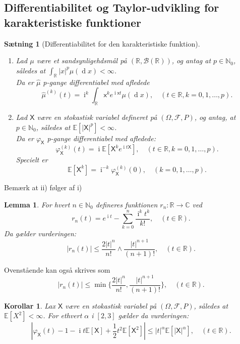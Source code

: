 \documentclass{article}
\newcommand{\N}{\mathbb{N}}
\newcommand{\R}{\mathbb{R}}
\newcommand{\C}{\mathbb{C}}
\newcommand{\E}{\mathbb{E}}
\newcommand{\1}{\mathbbm{1}}
\newcommand{\X}{\mathsf{X}}
\newcommand{\B}{\mathcal{B}}
\newcommand{\deriv}{\operatorname{d}}
\newcommand{\icomp}{\operatorname{i}}
\newcommand{\varx}{\varphi_\X}
\newcommand{\pfield}{(\Omega, \mathcal{F}, P)}
\newtheorem{lemma}[theorem]{Lemma}
\newtheorem{corollary}[theorem]{Korollar}
\newtheorem{proposition}[theorem]{Sætning}
\theoremstyle{boxed}
\begin{document}
\subsection{Differentiabilitet og Taylor-udvikling for karakteristiske funktioner}
\begin{theorem-box}
    \begin{proposition}[Differentiabilitet for den karakteristiske funktion]
        \begin{enumerate}
            \item[\textnormal{(i)}] Lad $\mu$ være et sandsynligehdsmål på $(\R, \B(\R))$, og antag at $p\in\N_0$, således at $\int_\R|x|^p\mu(\deriv x)<\infty$.
            \\Da er $\hat{\mu}$ p-gange differentiabel med afledede
            $$\hat{\mu}^{(k)}(t)=\icomp^k\int_{\R}\mathsf{x}^ke^{\icomp\mathsf{x}t}\mu(\deriv x), \quad (t\in\R, k=0,1,\dots, p).$$
            \item[\textnormal{(ii)}] Lad $\X$ være en stokastisk variabel defineret på $\pfield$, og antag, at $p\in\N_0$, således at $\E[|\X|^p]<\infty$.
            \\Da er $\varx$ p-gange differentiabel med afledede:
            $$\varx^{(k)}(t)=\icomp\E[\X^ke^{\icomp t\X}], \quad (t\in\R, k=0,1,\dots, p).$$ 
            Specielt er 
            $$\E[\X^k]=\icomp^{-k}\varx^{(k)}(0), \quad (k=0,1,\dots, p).$$
        \end{enumerate}
    \end{proposition}
\end{theorem-box}
Bemærk at ii) følger af i)
\begin{theorem-box}
    \begin{lemma}
        For hvert $n\in\N_0$ defineres funktionen $r_n:\R\rightarrow \C$ ved $$r_n(t)=e^{\icomp t}-\sum_{k=0}^n\frac{\icomp^k t^k}{k!}, \quad (t\in\R).$$
        Da gælder vurderingen:
        $$|r_n(t)|\leq \frac{2|t|^n}{n!}\wedge \frac{|t|^{n+1}}{(n+1)!},\quad  (t\in\R).$$
    \end{lemma}
\end{theorem-box}
Ovenstående kan også skrives som 
$$|r_n(t)|\leq \min\{\frac{2|t|^n}{n!},\frac{|t|^{n+1}}{(n+1)!}\},\quad  (t\in\R).$$
\begin{theorem-box}
    \begin{corollary}
        Lax $\X$ være en stokastisk variabel på $\pfield$, således at $\E[X^2]<\infty$. For ethvert $\alpha$ i $[2,3]$ gælder da vurderingen:
        $$\left|\varx(t)-1-\icomp t\E[\X]+\frac{1}{2}t^2\E[\X^2]\right|\leq |t|^\alpha\E[|\X|^\alpha], \quad (t\in\R).$$
    \end{corollary}
\end{theorem-box}
\end{document}
